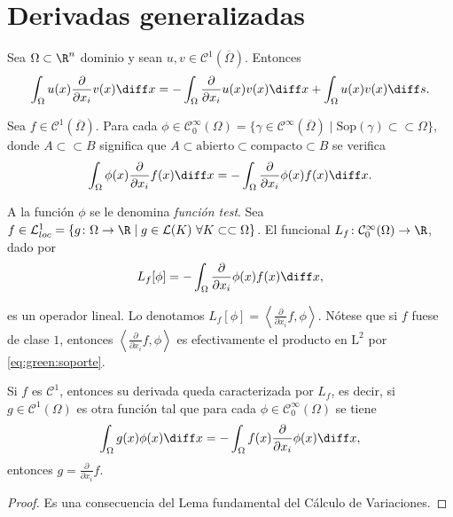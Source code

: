 \documentclass{article}
\begin{document}
\section{Derivadas generalizadas}

\begin{theorem}
  \label{thm:green}
  Sea $\Omega \subset \R^n$ dominio y sean $u, v \in \mathcal{C}^1(\overline{\Omega})$. Entonces
  \[ \int_{\Omega} u(x) \frac{\partial}{\partial x_i} v(x) \diff x = - \int_{\Omega}
    \frac{\partial}{\partial x_i} u(x) v(x) \diff x + \int_{\Omega} u(x)v(x) \diff s. \]
\end{theorem}

Sea $f \in \mathcal{C}^1(\overline{\Omega})$. Para cada
$\phi \in \mathcal{C}_0^\infty(\Omega) = \{\gamma \in \mathcal{C}^{\infty}(\overline{\Omega}) \mid
\mathrm{Sop}(\gamma) \subset \subset \Omega\}$, donde $A \subset \subset B$ significa que
$A \subset \text{abierto} \subset \text{compacto} \subset B$ se verifica
\begin{equation}
  \label{eq:green:soporte}
  \int_{\Omega} \phi(x) \frac{\partial}{\partial x_i} f(x) \diff x = - \int_{\Omega}
  \frac{\partial}{\partial x_i} \phi(x) f(x) \diff x.
\end{equation}

A la función $\phi$ se le denomina \emph{función test}. Sea
$f \in \mathcal{L}_{loc}^1 = \{g\colon \Omega \to \R \mid g \in \mathcal{L}(K) \ \forall K \subset
\subset \Omega \}$. El funcional $L_f\colon \mathcal{C}_0^\infty(\Omega) \to \R$, dado por
\[ L_f[\phi] = - \int_{\Omega} \frac{\partial}{\partial x_i} \phi(x) f(x) \diff x, \]

es un operador lineal. Lo denotamos
$L_f[\phi] = \left\langle \frac{\partial}{\partial x_i} f, \phi\right\rangle$. Nótese que si $f$
fuese de clase $1$, entonces $\left\langle \frac{\partial}{\partial x_i} f, \phi\right\rangle$ es
efectivamente el producto en $\mathrm{L}^2$ por \eqref{eq:green:soporte}.

\begin{proposition}
  Si $f$ es $\mathcal{C}^1$, entonces su derivada queda caracterizada por $L_f$, es decir, si
  $g \in \mathcal{C}^1(\Omega)$ es otra función tal que para cada
  $\phi \in \mathcal{C}_0^\infty(\Omega)$ se tiene
  \[ \int_{\Omega} g(x)\phi(x) \diff x = - \int_{\Omega} f(x) \frac{\partial}{\partial x_i} \phi(x)
    \diff x, \] entonces $g = \frac{\partial}{\partial x_i} f$.
\end{proposition}
\begin{proof}
  Es una consecuencia del Lema fundamental del Cálculo de Variaciones.
\end{proof}
\end{document}
